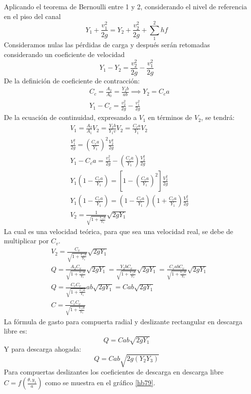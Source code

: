 Aplicando el teorema de Bernoulli entre 1 y 2, considerando el nivel de referencia en el piso del canal
\begin{equation*}
    Y_1 +\frac{v_1^2}{2g} = Y_2 +\frac{v_2^2}{2g} +\sum_1^2 hf
\end{equation*}
Consideramos nulas las pérdidas de carga y después serán retomadas considerando un coeficiente de velocidad
\begin{equation*}
    Y_1 - Y_2 = \frac{v_2^2}{2g} - \frac{v_1^2}{2g}
\end{equation*}
De la definición de coeficiente de contracción:
\begin{align*}
    &C_c = \frac{A_2}{A_0} = \frac{Y_2b}{ab} \implies Y_2 = C_ca\\
    &Y_1 - C_c =\frac{v_2^2}{2g} - \frac{v_1^2}{2g}
\end{align*}
De la ecuación de continuidad, expresando a $V_1$ en términos de $V_2$, se tendrá:
\begin{align*}
    &V_1 = \frac{A_2}{A_1}V_2 = \frac{Y_2b}{Y_1v}V_2 = \frac{C_ca}{Y_1}V_2\\
    &\frac{V_1^2}{2g} =\left(\frac{C_ca}{Y_1}\right)^2\frac{V_2^2}{2g}\\
    &Y_1 - C_ca =\frac{v_2^2}{2g} - \left(\frac{C_ca}{Y_1}\right)\frac{V_2^2}{2g}\\
    &Y_1\left(1 -\frac{C_ca}{Y_1}\right)=\left[1 -\left(\frac{C_ca}{Y_1}\right)^2\right]\frac{V_2^2}{2g}\\
    &Y_1\left(1 -\frac{C_ca}{Y_1}\right) =\left(1 -\frac{C_ca}{Y_1}\right)\left(1 +\frac{C_ca}{Y_1}\right)\frac{V_2^2}{2g}\\ 
    &V_2 = \frac{1}{\sqrt{1 +\frac{C_ca}{Y_1}}}\sqrt{2gY_1}
\end{align*}
La cual es una velocidad teórica, para que sea una velocidad real, se debe de multiplicar por $C_v$.
\begin{align*}
    &V_2 = \frac{C_v}{\sqrt{1 +\frac{C_ca}{Y_1}}} \sqrt{2gY_1}\\ 
    &Q = \frac{A_2C_v}{\sqrt{1 +\frac{C_ca}{Y_1}}} \sqrt{2gY_1} = \frac{Y_2b C_v}{\sqrt{1 + \frac{C_ca}{Y_1}}} \sqrt{2gY_1} = \frac{C_c a b C_v}{\sqrt{1 + \frac{C_ca}{Y_1}}} \sqrt{2gY_1}\\
    &Q  = \frac{C_c C_v}{\sqrt{1 + \frac{C_ca}{Y_1}}} ab\sqrt{2gY_1} = Cab \sqrt{2gY_1}\\
    &C = \frac{C_c C_v}{\sqrt{1 + \frac{C_ca}{Y_1}}}
\end{align*}
La fórmula de gasto para compuerta radial y deslizante rectangular en descarga libre es:
\begin{equation}
    Q = C a b \sqrt{2gY_1}
\end{equation}
Y para descarga ahogada:
\begin{equation}
    Q = C a b \sqrt{2g\left(Y_2 Y_3\right)}
\end{equation}
Para compuertas deslizantes los coeficientes de descarga en descarga libre
$C=f\left(\frac{\theta, y_1}{a}\right)$ como se muestra en el gráfico \ref{hb79}.

